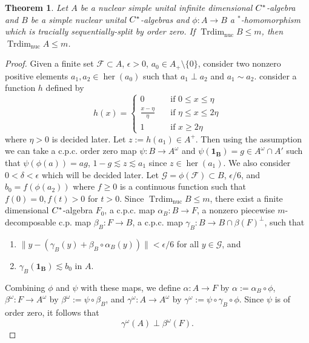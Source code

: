 \documentclass[10pt,a4paper]{amsart}
\newtheorem{thm}{Theorem}
\def\Trdim{\operatorname{Trdim}}
\def\her{\operatorname{her}}
\newcommand{\mc}{\mathcal}
\def\nuc{\operatorname{nuc}}
\begin{document}
\begin{thm}\label{T:Trdim}
Let $A$ be a nuclear simple unital infinite dimensional $C\sp*$-algebra and $B$ be a simple nuclear unital $C\sp*$-algebras and $\phi: A \to B $ a $^*$-homomorphism which is tracially sequentially-split by order zero. If $\Trdim_{\nuc} B \le m $, then $\Trdim_{\nuc} A \le m$. 
\end{thm}

\begin{proof} 
Given a finite set $\mc{F} \subset A$, $\epsilon>0$, $a_0 \in A_{+} \setminus \{ 0\}$, consider two nonzero positive elements $a_1, a_2 \in \her(a_0)$ such that $a_1 \perp a_2$ and $a_1 \sim a_2$.  consider a function $h$ defined by 
\[
 h(x)=\begin{cases}
 0 \quad & \text{if $0 \le x \le \eta$}\\
 \frac{x-\eta}{\eta} \quad & \text{if $\eta \le x \le 2\eta$}\\
 1 \quad &\text{if $x \ge 2 \eta$}
  \end{cases}
\] 
where $\eta >0$ is decided later.  Let $z:= h(a_1) \in A^{+}$. 
Then using the assumption we can take a c.p.c. order zero map $\psi: B \to A^{\omega}$  and $\psi(\mathbf{1_B})=g \in A^{\omega}\cap A'$ such that $\psi(\phi(a))=ag$,  $1- g \lesssim z \lesssim a_1$ since $z \in \her(a_1)$. 
We also consider $0< \delta < \epsilon$ which will be decided later.  Let $\mc{G}=\phi(\mc{F}) \subset B$, $\epsilon/6$, and $b_0=f(\phi(a_2))$ where $f\ge 0$ is a continuous function such that $f(0)=0, f(t)> 0$  for $t>0$. 
Since $\Trdim_{\nuc} B \le m$, there exist a finite dimensional $C\sp*$-algebra $F_0$, a c.p.c. map $\alpha_B: B \to F$, a nonzero piecewise $m$-decomposable c.p. map $\beta_B: F \to B$, a c.p.c. map $\gamma_B: B \to B\cap \beta(F)^{\perp}$, such that  
 \begin{enumerate}
\item $ \|y - (\gamma_B(y)+ \beta_B \circ \alpha_B (y) )\| < \epsilon/6$ for all $y\in \mc{G}$, and 
\item $\gamma_B(\mathbf{1_B}) \lesssim b_0$ in $A$. 
\end{enumerate}
Combining $\phi$ and $\psi$ with these maps, we define $\alpha: A \to F$ by $\alpha:= \alpha_B \circ \phi$,  $\beta^{\omega}: F \to A^{\omega}$ by $\beta^{\omega}:=\psi \circ \beta_B$, and $\gamma^{\omega}: A \to A^{\omega}$ by $\gamma^{\omega}:=\psi \circ \gamma_B \circ \phi$. Since $\psi$ is of order zero, it follows that \[\gamma^{\omega}(A) \perp \beta^{\omega}(F). \]


\end{proof}
\end{document}
